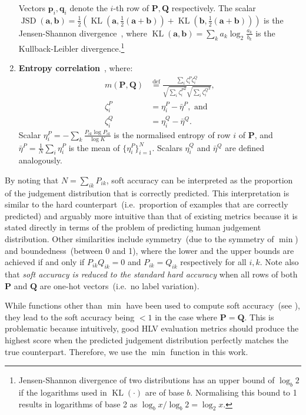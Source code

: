\documentclass[shortpaper]{clv2025}
\newcommand{\metric}[1]{\textbf{#1}\xspace}
\newcommand{\eqdef}{\overset{\mathrm{def}}{=}}  %
\DeclareMathOperator{\JSD}{JSD}
\DeclareMathOperator{\KL}{KL}
\begin{document}
\begin{enumerate}
    Vectors $\mathbf{p}_i,\mathbf{q}_i$ denote the $i$-th row of
    $\mathbf{P},\mathbf{Q}$ respectively. The scalar
    $\JSD(\mathbf{a},\mathbf{b})=\frac{1}{2}\left(\KL(\mathbf{a},\frac{1}{2}\left(\mathbf{a}+\mathbf{b}\right))+\KL(\mathbf{b},\frac{1}{2}\left(\mathbf{a}+\mathbf{b}\right))\right)$
    is the Jensen-Shannon divergence~\citep{lin1991}, where
    $\KL(\mathbf{a},\mathbf{b})=\sum_{k}a_k\log_2\frac{a_k}{b_k}$ is the
    Kullback-Leibler divergence.\footnote{Jensen-Shannon divergence of two
      distributions has an upper bound of $\log_b2$ if the logarithms used in
      $\KL(\cdot)$ are of base $b$. Normalising this bound to 1 results in
      logarithms of base 2 as $\log_b x/\log_b2=\log_2x$.}
  \item \metric{Entropy correlation}~\citep{uma2020}, where:
    \begin{align*}
      m(\mathbf{P},\mathbf{Q})&\eqdef\frac{\sum_i\zeta^P_i\zeta^Q_i}{\sqrt{\sum_i{\zeta^P_i}^2}\sqrt{\sum_i{\zeta^Q_i}^2}},\\
      \zeta^P_i&=\eta^P_i-\bar{\eta}^P,\text{ and }\\
      \zeta^Q_i&=\eta^Q_i-\bar{\eta}^Q.
    \end{align*}
    Scalar $\eta^P_i=-\sum_k\frac{P_{ik}\log P_{ik}}{\log K}$ is the normalised
    entropy of row $i$ of $\mathbf{P}$, and
    $\bar{\eta}^P=\frac{1}{N}\sum_{i}\eta^P_i$ is the mean of $\lbrace
    \eta^P_i\rbrace_{i=1}^N$. Scalars $\eta^Q_i$ and $\bar{\eta}^Q$ are defined
    analogously.
\end{enumerate}

By noting that $N=\sum_{ik}P_{ik}$, soft accuracy can be interpreted as the
proportion of the judgement distribution that is correctly predicted. This interpretation
is similar to the hard counterpart~(i.e.\ proportion of examples that are
correctly predicted) and arguably more intuitive than that of existing metrics
because it is stated directly in terms of the problem of predicting human
judgement distribution. Other similarities include symmetry~(due to the
symmetry of $\min$) and boundedness~(between 0 and 1), where the lower and the
upper bounds are achieved if and only if $P_{ik}Q_{ik}=0$ and $P_{ik}=Q_{ik}$
respectively for all $i,k$. Note also that \emph{soft accuracy is reduced to the
  standard hard accuracy} when all rows of both $\mathbf{P}$ and $\mathbf{Q}$
are one-hot vectors~(i.e.\ no label variation).

While functions other than $\min$ have been used to compute soft accuracy~(see
), they lead to the soft accuracy being $<1$ in the
case where $\mathbf{P}=\mathbf{Q}$. This is problematic because intuitively,
good HLV evaluation metrics should produce the highest score when the predicted
judgement distribution perfectly matches the true counterpart. Therefore, we
use the $\min$ function in this work.
\end{document}
